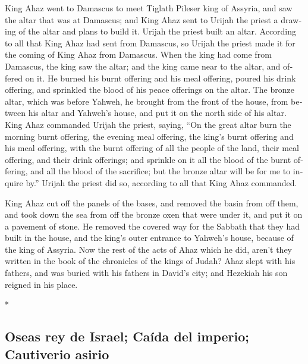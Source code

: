 \begin{paracol}{2}
\begin{otherlanguage}{english}
 King Ahaz went to Damascus to meet Tiglath Pileser king
of Assyria, and saw the altar that was at Damascus; and King Ahaz sent
to Urijah the priest a drawing of the altar and plans to build it.
 Urijah the priest built an altar. According to all that
King Ahaz had sent from Damascus, so Urijah the priest made it for the
coming of King Ahaz from Damascus.  When the king had
come from Damascus, the king saw the altar; and the king came near to
the altar, and offered on it.  He burned his burnt
offering and his meal offering, poured his drink offering, and sprinkled
the blood of his peace offerings on the altar.  The
bronze altar, which was before Yahweh, he brought from the front of the
house, from between his altar and Yahweh's house, and put it on the
north side of his altar.  King Ahaz commanded Urijah the
priest, saying, ``On the great altar burn the morning burnt offering,
the evening meal offering, the king's burnt offering and his meal
offering, with the burnt offering of all the people of the land, their
meal offering, and their drink offerings; and sprinkle on it all the
blood of the burnt offering, and all the blood of the sacrifice; but the
bronze altar will be for me to inquire by.''  Urijah the
priest did so, according to all that King Ahaz commanded.

 King Ahaz cut off the panels of the bases, and removed
the basin from off them, and took down the sea from off the bronze oxen
that were under it, and put it on a pavement of stone. 
He removed the covered way for the Sabbath that they had built in the
house, and the king's outer entrance to Yahweh's house, because of the
king of Assyria.  Now the rest of the acts of Ahaz which
he did, aren't they written in the book of the chronicles of the kings
of Judah?  Ahaz slept with his fathers, and was buried
with his fathers in David's city; and Hezekiah his son reigned in his
place.

\end{otherlanguage}

\switchcolumn[0]*

\hypertarget{oseas-rey-de-israel-cauxedda-del-imperio-cautiverio-asirio}{%
\subsection{Oseas rey de Israel; Caída del imperio; Cautiverio
asirio}\label{oseas-rey-de-israel-cauxedda-del-imperio-cautiverio-asirio}}


\end{paracol}
